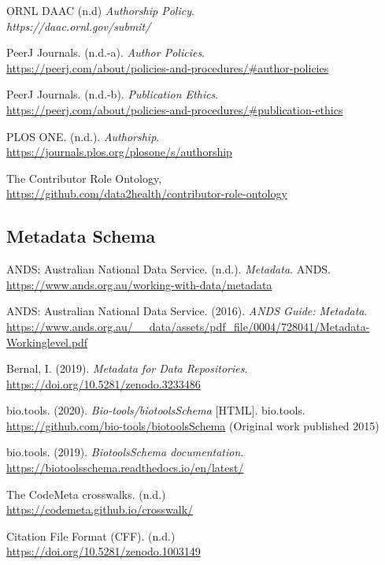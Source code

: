 \documentclass[11pt]{article}
\begin{document}
ORNL DAAC (n.d) \emph{Authorship Policy}.\\
\emph{https://daac.ornl.gov/submit/}

PeerJ Journals. (n.d.-a). \emph{Author Policies}.\\
\url{https://peerj.com/about/policies-and-procedures/\#author-policies}

PeerJ Journals. (n.d.-b). \emph{Publication Ethics}.\\
\url{https://peerj.com/about/policies-and-procedures/\#publication-ethics}

PLOS ONE. (n.d.). \emph{Authorship}.\\
\url{https://journals.plos.org/plosone/s/authorship}

The Contributor Role Ontology,\\
\url{https://github.com/data2health/contributor-role-ontology}


\vspace*{-2pt}
\subsection{Metadata Schema}
\label{metadata-schema}

ANDS: Australian National Data Service. (n.d.). \emph{Metadata}. ANDS.\\
\url{https://www.ands.org.au/working-with-data/metadata}

ANDS: Australian National Data Service. (2016). \emph{ANDS Guide:
Metadata}.\\
\url{https://www.ands.org.au/__data/assets/pdf_file/0004/728041/Metadata-Workinglevel.pdf}

Bernal, I. (2019). \emph{Metadata for Data Repositories}.\\
\url{https://doi.org/10.5281/zenodo.3233486}

bio.tools. (2020). \emph{Bio-tools/biotoolsSchema} {[}HTML{]}.
bio.tools.\\
\url{https://github.com/bio-tools/biotoolsSchema}
(Original work published 2015)

bio.tools. (2019). \emph{BiotoolsSchema documentation}.\\
\url{https://biotoolsschema.readthedocs.io/en/latest/}

The CodeMeta crosswalks. (n.d.)\\
\url{https://codemeta.github.io/crosswalk/}

Citation File Format (CFF). (n.d.)\\
\url{https://doi.org/10.5281/zenodo.1003149}
\end{document}
